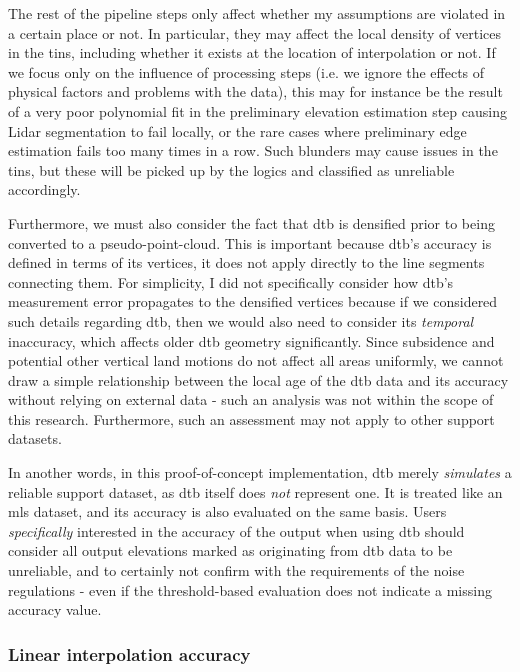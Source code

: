 The rest of the pipeline steps only affect whether my assumptions are violated in a certain place or not. In particular, they may affect the local density of vertices in the \ac{tin}s, including whether it exists at the location of interpolation or not. If we focus only on the influence of processing steps (i.e. we ignore the effects of physical factors and problems with the data), this may for instance be the result of a very poor polynomial fit in the preliminary elevation estimation step causing Lidar segmentation to fail locally, or the rare cases where preliminary edge estimation fails too many times in a row. Such blunders may cause issues in the \ac{tin}s, but these will be picked up by the logics and classified as unreliable accordingly.

Furthermore, we must also consider the fact that \ac{dtb} is densified prior to being converted to a pseudo-point-cloud. This is important because \ac{dtb}'s accuracy is defined in terms of its vertices, it does not apply directly to the line segments connecting them. For simplicity, I did not specifically consider how \ac{dtb}'s measurement error propagates to the densified vertices because if we considered such details regarding \ac{dtb}, then we would also need to consider its \textit{temporal} inaccuracy, which affects older \ac{dtb} geometry significantly. Since subsidence and potential other vertical land motions do not affect all areas uniformly, we cannot draw a simple relationship between the local age of the \ac{dtb} data and its accuracy without relying on external data - such an analysis was not within the scope of this research. Furthermore, such an assessment may not apply to other support datasets.

In another words, in this proof-of-concept implementation, \ac{dtb} merely \textit{simulates} a reliable support dataset, as \ac{dtb} itself does \textit{not} represent one. It is treated like an \ac{mls} dataset, and its accuracy is also evaluated on the same basis. Users \textit{specifically} interested in the accuracy of the output when using \ac{dtb} should consider all output elevations marked as originating from \ac{dtb} data to be unreliable, and to certainly not confirm with the requirements of the noise regulations - even if the threshold-based evaluation does not indicate a missing accuracy value.

\subsubsection{Linear interpolation accuracy}

